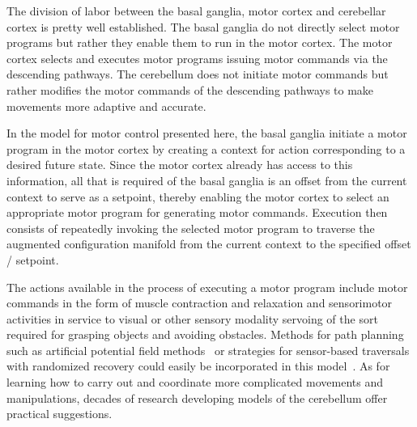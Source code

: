 The division of labor between the basal ganglia, motor cortex and cerebellar cortex is pretty well established. The basal ganglia do not directly select motor programs but rather they enable them to run in the motor cortex. The motor cortex selects and executes motor programs issuing motor commands via the descending pathways. The cerebellum does not initiate motor commands but rather modifies the motor commands of the descending pathways to make movements more adaptive and accurate. 

In the model for motor control presented here, the basal ganglia initiate a motor program in the motor cortex by creating a context for action corresponding to a desired future state. Since the motor cortex already has access to this information, all that is required of the basal ganglia is an offset from the current context to serve as a setpoint, thereby enabling the motor cortex to select an appropriate motor program for generating motor commands. Execution then consists of repeatedly invoking the selected motor program to traverse the augmented configuration manifold from the current context to the specified offset / setpoint.

The actions available in the process of executing a motor program include motor commands in the form of muscle contraction and relaxation and sensorimotor activities in service to visual {\emdash{}} or other sensory modality {\emdash{}} servoing of the sort required for grasping objects and avoiding obstacles. Methods for path planning such as artificial potential field methods~\cite{KhatibIJRR-86} or strategies for sensor-based traversals with randomized recovery could easily be incorporated in this model~\cite{LiarokapisetalICAR-15}. As for learning how to carry out and coordinate more complicated movements and manipulations, decades of research developing models of the cerebellum offer practical suggestions.

